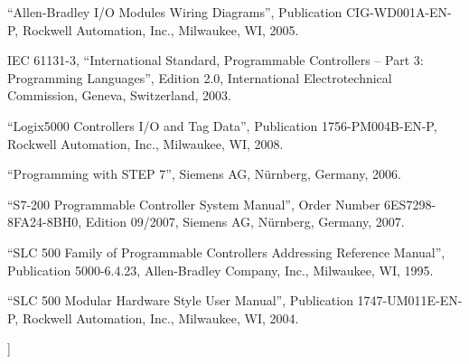 \noindent
``Allen-Bradley I/O Modules Wiring Diagrams'', Publication CIG-WD001A-EN-P, Rockwell Automation, Inc., Milwaukee, WI, 2005.

\vskip 10pt

\noindent
IEC 61131-3, ``International Standard, Programmable Controllers -- Part 3: Programming Languages'', Edition 2.0, International Electrotechnical Commission, Geneva, Switzerland, 2003.

\vskip 10pt

\noindent
``Logix5000 Controllers I/O and Tag Data'', Publication 1756-PM004B-EN-P, Rockwell Automation, Inc., Milwaukee, WI, 2008.

\vskip 10pt

\noindent
``Programming with STEP 7'', Siemens AG, N\"urnberg, Germany, 2006.

\vskip 10pt

\noindent
``S7-200 Programmable Controller System Manual'', Order Number 6ES7298-8FA24-8BH0, Edition 09/2007, Siemens AG, N\"urnberg, Germany, 2007.

\vskip 10pt

\noindent
``SLC 500 Family of Programmable Controllers Addressing Reference Manual'', Publication 5000-6.4.23, Allen-Bradley Company, Inc., Milwaukee, WI, 1995.

\vskip 10pt

\noindent
``SLC 500 Modular Hardware Style User Manual'', Publication 1747-UM011E-EN-P, Rockwell Automation, Inc., Milwaukee, WI, 2004.















]
